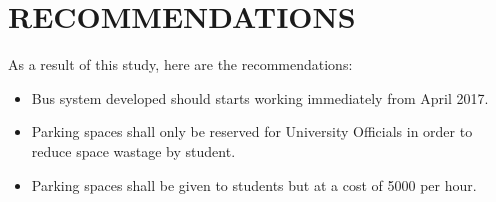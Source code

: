 \documentclass{article}
\begin{document}
\section{RECOMMENDATIONS}
As a result of this study, here are the recommendations:

\begin{itemize}
\item {Bus system developed should starts working immediately from April 2017.}
\item {Parking spaces shall only be reserved for University Officials in order to reduce space wastage by student.}
\item {Parking spaces shall be given to students but at a cost of 5000 per hour.}
\end{itemize}
\end{document}
